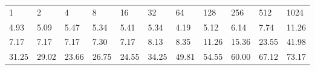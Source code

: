 \begin{longtable}[]{@{}lllllllllll@{}}
\toprule
\endhead
1 & 2 & 4 & 8 & 16 & 32 & 64 & 128 & 256 & 512 & 1024\tabularnewline
4.93 & 5.09 & 5.47 & 5.34 & 5.41 & 5.34 & 4.19 & 5.12 & 6.14 & 7.74 &
11.26\tabularnewline
7.17 & 7.17 & 7.17 & 7.30 & 7.17 & 8.13 & 8.35 & 11.26 & 15.36 & 23.55 &
41.98\tabularnewline
31.25 & 29.02 & 23.66 & 26.75 & 24.55 & 34.25 & 49.81 & 54.55 & 60.00 &
67.12 & 73.17\tabularnewline
\bottomrule
\end{longtable}
